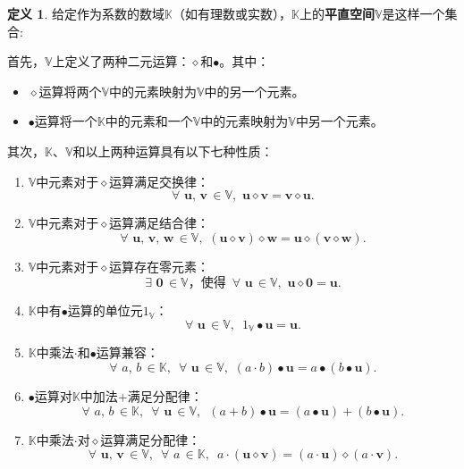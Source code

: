 \documentclass[12pt,UTF8]{ctexbook}
\theoremstyle{definition}
\newtheorem{df}{定义}[section]
\theoremstyle{plain}
\begin{document}
\begin{df}
    给定作为系数的数域$\mathbb{K}$（如有理数或实数），$\mathbb{K}$上的\textbf{平直空间}$\mathbb{V}$是这样一个集合:

    首先，$\mathbb{V}$上定义了两种二元运算：$\diamond$和$\bullet$。其中：
    \begin{itemize}
        \item $\diamond$运算将两个$\mathbb{V}$中的元素映射为$\mathbb{V}$中的另一个元素。
        \item $\bullet$运算将一个$\mathbb{K}$中的元素和一个$\mathbb{V}$中的元素映射为$\mathbb{V}$中另一个元素。
    \end{itemize}
    其次，$\mathbb{K}$、$\mathbb{V}$和以上两种运算具有以下七种性质：
    \begin{enumerate}
        \item $\mathbb{V}$中元素对于$\diamond$运算满足交换律：
        $$\forall \,\, \mathbf{u}, \, \mathbf{v} \, \in \mathbb{V}, \,\, \mathbf{u} \diamond \mathbf{v} = \mathbf{v} \diamond \mathbf{u}.$$
        \item $\mathbb{V}$中元素对于$\diamond$运算满足结合律：
        $$\forall \,\, \mathbf{u}, \, \mathbf{v}, \, \mathbf{w} \, \in \mathbb{V}, \,\, (\mathbf{u} \diamond \mathbf{v}) \diamond \mathbf{w} = \mathbf{u} \diamond (\mathbf{v} \diamond \mathbf{w}).$$
        \item $\mathbb{V}$中元素对于$\diamond$运算存在零元素：
        $$\exists \,\, \mathbf{0} \, \in \mathbb{V} \mbox{，使得}\,\,\, \forall \,\, \mathbf{u} \, \in \mathbb{V}, \,\, \mathbf{u} \diamond \mathbf{0} = \mathbf{u}.$$
        \item $\mathbb{K}$中有$\bullet$运算的单位元$1_{\mathbb{V}}$：
        $$\forall \,\, \mathbf{u} \, \in \mathbb{V}, \,\,\, 1_{\mathbb{V}} \bullet \mathbf{u} = \mathbf{u}. $$
        \item $\mathbb{K}$中乘法$\cdot$和$\bullet$运算兼容：
        $$\forall \,\, a, \, b \, \in \mathbb{K}, \,\,\, \forall \,\, \mathbf{u} \, \in \mathbb{V}, \,\, (a \cdot b)\bullet\mathbf{u} = a \bullet (b\bullet\mathbf{u}).$$
        \item $\bullet$运算对$\mathbb{K}$中加法$+$满足分配律：
        $$\forall \,\, a, \, b \, \in \mathbb{K}, \,\,\, \forall \,\, \mathbf{u} \, \in \mathbb{V}, \,\,\, (a + b)\bullet\mathbf{u} = (a \bullet \mathbf{u}) + (b \bullet \mathbf{u}). $$
        \item $\mathbb{K}$中乘法$\cdot$对$\diamond$运算满足分配律：
        $$\forall \,\, \mathbf{u}, \, \mathbf{v} \, \in \mathbb{V}, \,\,\, \forall \,\, a \, \in \mathbb{K}, \,\,\, a\cdot(\mathbf{u} \diamond \mathbf{v}) = (a \cdot \mathbf{u}) \diamond (a \cdot \mathbf{v}). $$
    \end{enumerate}
\end{df}
\end{document}
